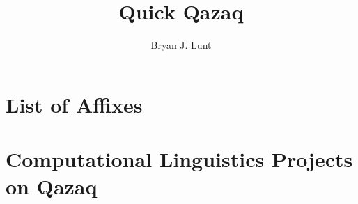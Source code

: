 \documentclass[12pt]{qqbook}
\title{Quick Qazaq}
\author{Bryan J. Lunt}
\date{} %
\begin{document}
\frontmatter
\maketitle
\tableofcontents

\mainmatter




\appendix %
\chapter{List of Affixes}
\lipsum[1]

\chapter{Computational Linguistics Projects on Qazaq}
\lipsum[2]

\backmatter
\lipsum[1]
\end{document}
